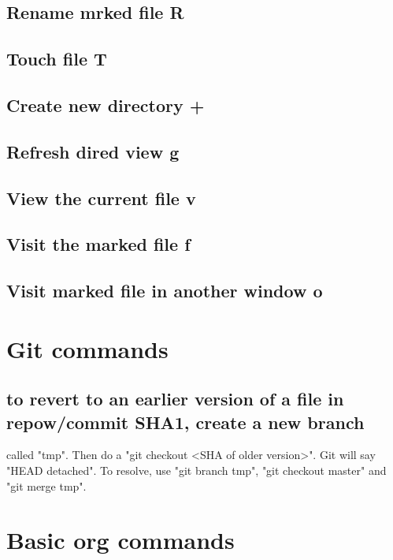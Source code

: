 \documentclass[11pt]{article}
\begin{document}
\subsection{Rename mrked file R}
\label{sec:org7d83a30}

\subsection{Touch file T}
\label{sec:orgf9c3139}

\subsection{Create new directory +}
\label{sec:org73ca861}

\subsection{Refresh dired view g}
\label{sec:org4450582}

\subsection{View the current file v}
\label{sec:org77d4cf9}

\subsection{Visit the marked file f}
\label{sec:org2a61c42}

\subsection{Visit marked file in another window o}
\label{sec:orge3c16d8}


\section{Git commands}
\label{sec:org1648d04}

\subsection{to revert to an earlier version of a file in repow/commit SHA1, create a new branch}
\label{sec:org5c0edba}
called "tmp". Then do a "git checkout <SHA of older version>". Git will say "HEAD detached".
To resolve, use "git branch tmp", "git checkout master" and "git merge tmp".

\section{Basic org commands}
\label{sec:org60b28a8}
\end{document}
